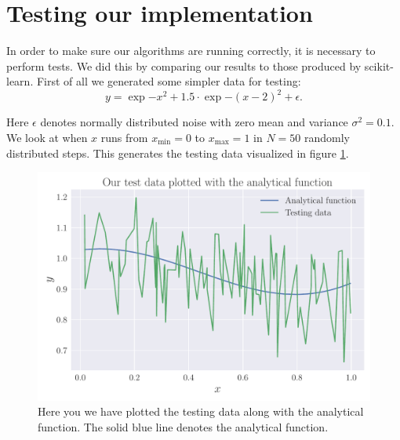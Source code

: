 \documentclass[reprint,english,notitlepage,aps,nobalancelastpage,nofootinbib]{revtex4-1}  %
\begin{document}
\section{Testing our implementation}\label{Apx:test}
In order to make sure our algorithms are running correctly, it is necessary to perform tests. We did this by comparing our results to those produced by scikit-learn. First of all we generated some simpler data for testing:
\begin{equation}
	\label{eq:test_data}
	y = \exp{-x^2} + 1.5\cdot\exp{-(x-2)^2} + \epsilon.
\end{equation}

Here $\epsilon$ denotes normally distributed noise with zero mean and variance $\sigma^2 = 0.1$. We look at when $x$ runs from $x_\text{min} = 0$ to $x_\text{max} = 1$ in $N = 50$ randomly distributed steps. This generates the testing data visualized in figure \ref{fig:TestingData}.

\begin{figure}[H]
	\includegraphics[width=\linewidth]{Testing_data.pdf}
	\caption{Here you we have plotted the testing data along with the analytical function. The solid blue line denotes the analytical function.}
	\label{fig:TestingData}
\end{figure}
\end{document}
